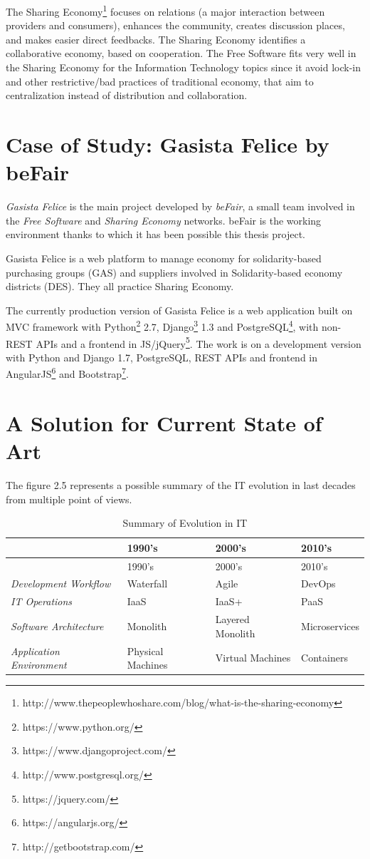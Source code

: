 The Sharing Economy\footnote{http://www.thepeoplewhoshare.com/blog/what-is-the-sharing-economy} focuses on relations (a major interaction between providers and consumers), enhances the community, creates discussion places, and makes easier direct feedbacks. The Sharing Economy identifies a collaborative economy, based on cooperation. The Free Software fits very well in the Sharing Economy for the Information
Technology topics since it avoid lock-in and other restrictive/bad practices of traditional economy, that aim to centralization instead of distribution and collaboration.

\section{Case of Study: Gasista
Felice by beFair}\label{case-of-study-gasista-felice-by-befair}

\textit{Gasista Felice} is the main project developed by \textit{beFair}, a
small team involved in the \textit{Free Software} and \textit{Sharing
Economy} networks. beFair is the working environment thanks to which it
has been possible this thesis project.

Gasista Felice is a web platform to manage economy for solidarity-based
purchasing groups (GAS) and suppliers involved in Solidarity-based
economy districts (DES). They all practice Sharing Economy.

The currently production version of Gasista Felice is a web application
built on MVC framework with Python\footnote{https://www.python.org/} 2.7, Django\footnote{https://www.djangoproject.com/} 1.3 and PostgreSQL\footnote{http://www.postgresql.org/}, with
non-REST APIs and a frontend in JS/jQuery\footnote{https://jquery.com/}. The work is on a development
version with Python and Django 1.7, PostgreSQL, REST APIs and frontend
in AngularJS\footnote{https://angularjs.org/} and Bootstrap\footnote{http://getbootstrap.com/}.

\section{A Solution for Current State of
Art}\label{a-solution-for-current-state-of-art}

The figure 2.5 represents a possible summary of the IT evolution in last decades from multiple point of views.

\begin{longtable}[c]{@{}llll@{}}
\caption{Summary of Evolution in IT}\tabularnewline
\toprule
& 1990's & 2000's & 2010's\tabularnewline
\midrule
\endfirsthead
\toprule
& 1990's & 2000's & 2010's\tabularnewline
\midrule
\endhead
\textit{Development Workflow} & Waterfall & Agile & DevOps\tabularnewline
\textit{IT Operations} & IaaS & IaaS+ & PaaS\tabularnewline
\textit{Software Architecture} & Monolith & Layered Monolith &
Microservices\tabularnewline
\textit{Application Environment} & Physical Machines & Virtual Machines &
Containers\tabularnewline
\bottomrule
\end{longtable}

